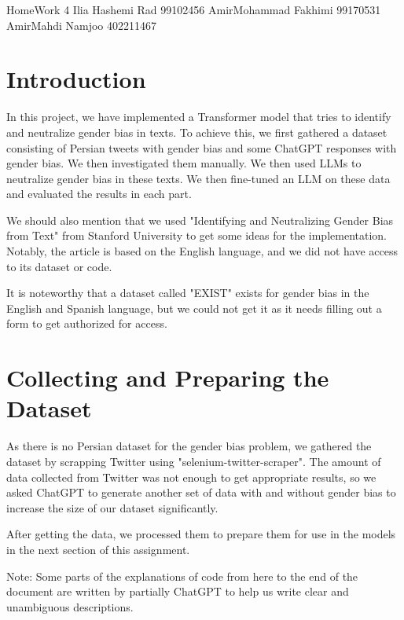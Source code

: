 \documentclass{solutionclass} %
\begin{document}
\pretitle
{HomeWork 4} %
{Ilia Hashemi Rad}
{99102456}
{AmirMohammad Fakhimi}
{99170531}
{AmirMahdi Namjoo}
{402211467}

\def\homeworkNumber{2}

\makeatletter
    \startcontents[sections]
\makeatother
    \def\Solu{Explanations}

\section{Introduction}

\begin{solution}
    In this project, we have implemented a Transformer model that tries to identify and neutralize gender bias in texts. To achieve this, we first gathered a dataset consisting of Persian tweets with gender bias and some ChatGPT responses with gender bias. We then investigated them manually. We then used LLMs to neutralize gender bias in these texts. We then fine-tuned an LLM on these data and evaluated the results in each part.


We should also mention that we used "Identifying and Neutralizing Gender Bias from Text" from Stanford University to get some ideas for the implementation. Notably, the article is based on the English language, and we did not have access to its dataset or code.

It is noteworthy that a dataset called "EXIST" exists for gender bias in the English and Spanish language, but we could not get it as it needs filling out a form to get authorized for access.
\end{solution}


\section{Collecting and Preparing the Dataset}

\begin{solution}
As there is no Persian dataset for the gender bias problem, we gathered the dataset by scrapping Twitter using "selenium-twitter-scraper". The amount of data collected from Twitter was not enough to get appropriate results, so we asked ChatGPT to generate another set of data with and without gender bias to increase the size of our dataset significantly.

After getting the data, we processed them to prepare them for use in the models in the next section of this assignment.


Note: Some parts of the explanations of code from here to the end of the document are written by partially ChatGPT to help us write clear and unambiguous descriptions.

\end{solution}
\end{document}
